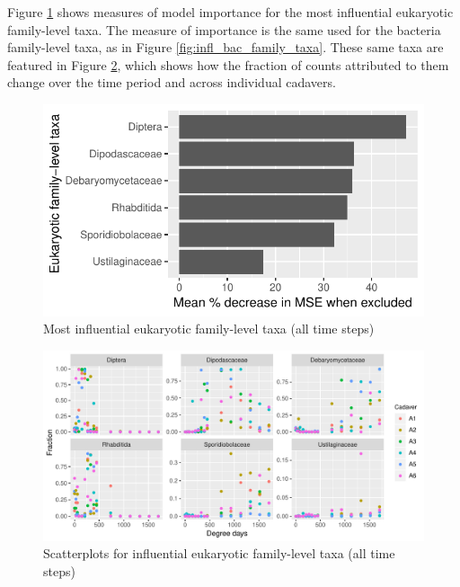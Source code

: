\documentclass{article}
\begin{document}
Figure \ref{fig:infl_euk_family_taxa} shows measures of model
importance for the most influential eukaryotic family-level taxa.  The
measure of importance is the same used for the bacteria family-level
taxa, as in Figure \ref{fig:infl_bac_family_taxa}.  These same taxa
are featured in Figure \ref{fig:infl_euk_family_all_data_scatter},
which shows how the fraction of counts attributed to them change over
the time period and across individual cadavers.
\begin{figure}
  \centering
  \includegraphics{../eukaryote_data/only_families/all_time_steps/hit_1perc_twice/orig_units_all_data_families_PercIncMSE_barchart}
  \caption{Most influential eukaryotic family-level taxa (all time steps)}
  \label{fig:infl_euk_family_taxa}
\end{figure}

\begin{figure}
  \centering
  \includegraphics[width=7.5in]{../eukaryote_data/only_families/all_time_steps/hit_1perc_twice/infl_euk_family_all_data_scatter}
  \caption{Scatterplots for influential eukaryotic family-level taxa (all time steps)}
  \label{fig:infl_euk_family_all_data_scatter}
\end{figure}
\end{document}
